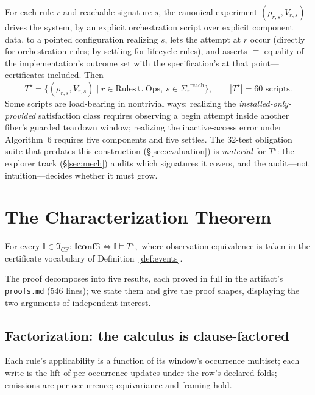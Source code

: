 \documentclass[sigplan,screen,review,nonacm]{acmart}
\newcommand{\Spec}{\ensuremath{\mathbb S}}
\newcommand{\Impl}{\ensuremath{\mathbb I}}
\newcommand{\conf}{\mathrel{\mathbf{conf}}}
\newcommand{\CF}{\ensuremath{\mathfrak I_{\mathrm{CF}}}}
\newcommand{\Tstar}{\ensuremath{T^{\star}}}
\newcommand{\occ}[1]{\ensuremath{\Sigma_{#1}}}
\begin{document}
For each rule $r$ and reachable signature $s$, the canonical experiment
$(\rho_{r,s}, V_{r,s})$ drives the system, by an explicit orchestration script
over explicit component data, to a pointed configuration realizing $s$, lets
the attempt at $r$ occur (directly for orchestration rules; by settling for
lifecycle rules), and asserts $\equiv$-equality of the implementation's outcome
set with the specification's at that point---certificates included. Then
\[
\Tstar = \{(\rho_{r,s}, V_{r,s}) \mid r \in \mathrm{Rules} \cup \mathrm{Ops},\
s \in \occ r^{\mathrm{reach}}\}, \qquad |\Tstar| = 60 \text{ scripts}.
\]
Some scripts are load-bearing in nontrivial ways: realizing the
\emph{installed-only-provided} satisfaction class requires observing a begin
attempt inside another fiber's guarded teardown window; realizing the
inactive-access error under Algorithm~6 requires five components and five
settles. The 32-test obligation suite that predates this construction
(\S\ref{sec:evaluation}) is \emph{material} for \Tstar: the explorer track
(\S\ref{sec:mech}) audits which signatures it covers, and the audit---not
intuition---decides whether it must grow.

\section{The Characterization Theorem}\label{sec:theorem}

\begin{theorem}\label{thm:main}
For every $\Impl \in \CF$:
\(
\Impl \conf \Spec \iff \Impl \models \Tstar,
\)
where observation equivalence is taken in the certificate vocabulary of
Definition~\ref{def:events}.
\end{theorem}

The proof decomposes into five results, each proved in full in the artifact's
\texttt{proofs.md} (546 lines); we state them and give the proof shapes,
displaying the two arguments of independent interest.

\subsection{Factorization: the calculus is clause-factored}

\begin{theorem}[$\Spec \in \CF$]\label{thm:fact}
Each rule's applicability is a function of its window's occurrence multiset;
each write is the lift of per-occurrence updates under the row's declared
folds; emissions are per-occurrence; equivariance and framing hold.
\end{theorem}
\end{document}
